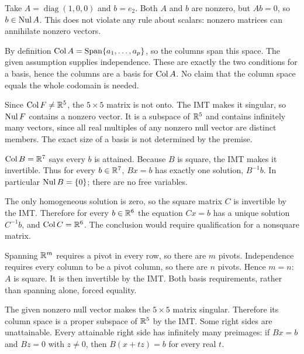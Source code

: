 Take $A=\operatorname{diag}(1,0,0)$ and $b=e_2$.
Both $A$ and $b$ are nonzero, but $Ab=0$, so $b\in\operatorname{Nul} A$.
This does not violate any rule about scalars: nonzero matrices can annihilate
nonzero vectors.

By definition $\operatorname{Col} A=\operatorname{Span}\{a_1,\ldots,a_p\}$, so the columns span
this space. The given assumption supplies independence. These are exactly
the two conditions for a basis, hence the columns are a basis for $\operatorname{Col} A$.
No claim that the column space equals the whole codomain is needed.

Since $\operatorname{Col} F\ne\mathbb{R}^5$, the $5\times5$ matrix is not onto.
The IMT makes it singular, so $\operatorname{Nul} F$ contains a nonzero vector.
It is a subspace of $\mathbb{R}^5$ and contains infinitely many vectors, since
all real multiples of any nonzero null vector are distinct members.
The exact size of a basis is not determined by the premise.

$\operatorname{Col} B=\mathbb{R}^7$ says every $b$ is attained.
Because $B$ is square, the IMT makes it invertible. Thus for every
$b\in\mathbb{R}^7$, $Bx=b$ has exactly one solution, $B^{-1}b$.
In particular $\operatorname{Nul} B=\{0\}$; there are no free variables.

The only homogeneous solution is zero, so the square matrix $C$ is
invertible by the IMT. Therefore for every $b\in\mathbb{R}^6$ the equation
$Cx=b$ has a unique solution $C^{-1}b$, and $\operatorname{Col} C=\mathbb{R}^6$.
The conclusion would require qualification for a nonsquare matrix.

Spanning $\mathbb{R}^m$ requires a pivot in every row, so there are $m$ pivots.
Independence requires every column to be a pivot column, so there are
$n$ pivots. Hence $m=n$: $A$ is square. It is then invertible by the
IMT. Both basis requirements, rather than spanning alone, forced equality.

The given nonzero null vector makes the $5\times5$ matrix singular.
Therefore its column space is a proper subspace of $\mathbb{R}^5$ by the IMT.
Some right sides are unattainable. Every attainable right side has
infinitely many preimages: if $Bx=b$ and $Bz=0$ with $z\ne0$, then
$B(x+tz)=b$ for every real $t$.

